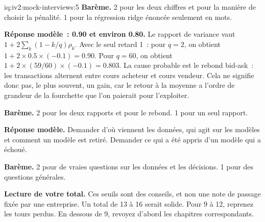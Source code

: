 \begin{solution}{iq:iv2:mock-interviews:5}
\textbf{Barème.} 2 pour les deux chiffres et pour la manière de choisir la pénalité. 1 pour la régression ridge énoncée seulement en mots.

\ivstop
\textbf{Réponse modèle~: 0.90 et environ 0.80.} Le rapport de variance vaut $1 + 2\sum_{k}(1 - k/q)\rho_k$. Avec le seul retard 1~: pour $q = 2$, on obtient $1 + 2 \times 0.5 \times (-0.1) = 0.90$. Pour $q = 60$, on obtient $1 + 2 \times (59/60) \times (-0.1) = 0.803$. La cause probable est le rebond bid-ask~: les transactions alternent entre cours acheteur et cours vendeur. Cela ne signifie donc pas, le plus souvent, un gain, car le retour à la moyenne a l'ordre de grandeur de la fourchette que l'on paierait pour l'exploiter.

\textbf{Barème.} 2 pour les deux rapports et pour le rebond. 1 pour un seul rapport.

\ivstop
\textbf{Réponse modèle.} Demander d'où viennent les données, qui agit sur les modèles et comment un modèle est retiré. Demander ce qui a été appris d'un modèle qui a échoué.

\textbf{Barème.} 2 pour de vraies questions sur les données et les décisions. 1 pour des questions générales.

\medskip
\textbf{Lecture de votre total.} Ces seuils sont des conseils, et non une note de passage fixée par une entreprise. Un total de 13 à 16 serait solide. Pour 9 à 12, reprenez les tours perdus. En dessous de 9, revoyez d'abord les chapitres correspondants.

\end{solution}

